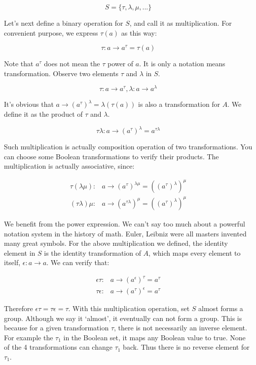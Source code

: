 \documentclass[b5paper]{article}
\begin{document}
\[
S = \{\tau, \lambda, \mu, ...\}
\]

Let's next define a binary operation for $S$, and call it as multiplication. For convenient purpose, we express $\tau(a)$ as this way:

\[
\tau: a \to a^\tau = \tau(a)
\]

Note that $a^\tau$ does not mean the $\tau$ power of $a$. It is only a notation means transformation. Observe two elements $\tau$ and $\lambda$ in $S$.

\[
\tau: a \to a^\tau,  \lambda: a \to a^\lambda
\]

It's obvious that $a \to (a^\tau)^\lambda = \lambda(\tau(a))$ is also a transformation for $A$. We define it as the product of $\tau$ and $\lambda$.

\[
\tau\lambda: a \to (a^\tau)^\lambda = a^{\tau\lambda}
\]

Such multiplication is actually composition operation of two transformations. You can choose some Boolean transformations to verify their products. The multiplication is actually associative, since:

\[
\begin{array}{rl}
\tau(\lambda\mu): & a \to (a^\tau)^{\lambda\mu} = ((a^\tau)^\lambda)^\mu \\
(\tau\lambda)\mu: & a \to (a^{\tau\lambda})^\mu = ((a^\tau)^\lambda)^\mu
\end{array}
\]

We benefit from the power expression. We can't say too much about a powerful notation system in the history of math. Euler, Leibniz were all masters invented many great symbols. For the above multiplication we defined, the identity element in $S$ is the identity transformation of $A$, which maps every element to itself, $\epsilon: a \to a$. We can verify that:

\[
\begin{array}{rl}
\epsilon\tau: & a \to (a^\epsilon)^\tau = a^\tau \\
\tau\epsilon: & a \to (a^\tau)^\epsilon = a^\tau
\end{array}
\]

Therefore $\epsilon\tau = \tau\epsilon = \tau$. With this multiplication operation, set $S$ almost forms a group. Although we say it `almost', it eventually can not form a group. This is because for a given transformation $\tau$, there is not necessarily an inverse element. For example the $\tau_1$ in the Boolean set, it maps any Boolean value to true. None of the 4 transformations can change $\tau_1$ back. Thus there is no reverse element for $\tau_1$.
\end{document}
